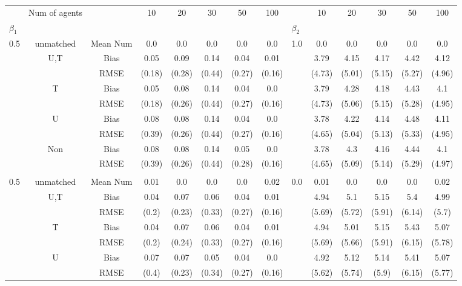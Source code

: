 \begin{tabular}{@{\extracolsep{5pt}}lc|cccccc|lccccc}
\toprule 
 & Num of agents &  & 10 & 20 & 30 & 50 & 100 &  & 10 & 20 & 30 & 50 & 100 \\
$\beta_1$ &  &  &  &  &  &  &  & $\beta_2$ &  &  &  &  &  \\
\midrule 
0.5 & unmatched & Mean Num & 0.0 & 0.0 & 0.0 & 0.0 & 0.0 & 1.0 & 0.0 & 0.0 & 0.0 & 0.0 & 0.0 \\
 & U,T & Bias & 0.05 & 0.09 & 0.14 & 0.04 & 0.01 &  & 3.79 & 4.15 & 4.17 & 4.42 & 4.12 \\
 &  & RMSE & (0.18) & (0.28) & (0.44) & (0.27) & (0.16) &  & (4.73) & (5.01) & (5.15) & (5.27) & (4.96) \\
 & T & Bias & 0.05 & 0.08 & 0.14 & 0.04 & 0.0 &  & 3.79 & 4.28 & 4.18 & 4.43 & 4.1 \\
 &  & RMSE & (0.18) & (0.26) & (0.44) & (0.27) & (0.16) &  & (4.73) & (5.06) & (5.15) & (5.28) & (4.95) \\
 & U & Bias & 0.08 & 0.08 & 0.14 & 0.04 & 0.0 &  & 3.78 & 4.22 & 4.14 & 4.48 & 4.11 \\
 &  & RMSE & (0.39) & (0.26) & (0.44) & (0.27) & (0.16) &  & (4.65) & (5.04) & (5.13) & (5.33) & (4.95) \\
 & Non & Bias & 0.08 & 0.08 & 0.14 & 0.05 & 0.0 &  & 3.78 & 4.3 & 4.16 & 4.44 & 4.1 \\
 &  & RMSE & (0.39) & (0.26) & (0.44) & (0.28) & (0.16) &  & (4.65) & (5.09) & (5.14) & (5.29) & (4.97) \\
 &  &  &  &  &  &  &  &  &  &  &  &  &  \\
0.5 & unmatched & Mean Num & 0.01 & 0.0 & 0.0 & 0.0 & 0.02 & 0.0 & 0.01 & 0.0 & 0.0 & 0.0 & 0.02 \\
 & U,T & Bias & 0.04 & 0.07 & 0.06 & 0.04 & 0.01 &  & 4.94 & 5.1 & 5.15 & 5.4 & 4.99 \\
 &  & RMSE & (0.2) & (0.23) & (0.33) & (0.27) & (0.16) &  & (5.69) & (5.72) & (5.91) & (6.14) & (5.7) \\
 & T & Bias & 0.04 & 0.07 & 0.06 & 0.04 & 0.01 &  & 4.94 & 5.01 & 5.15 & 5.43 & 5.07 \\
 &  & RMSE & (0.2) & (0.24) & (0.33) & (0.27) & (0.16) &  & (5.69) & (5.66) & (5.91) & (6.15) & (5.78) \\
 & U & Bias & 0.07 & 0.07 & 0.05 & 0.04 & 0.0 &  & 4.92 & 5.12 & 5.14 & 5.41 & 5.07 \\
 &  & RMSE & (0.4) & (0.23) & (0.34) & (0.27) & (0.16) &  & (5.62) & (5.74) & (5.9) & (6.15) & (5.77) \\

\end{tabular}
